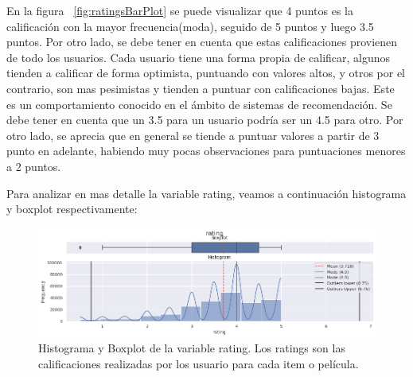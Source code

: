 \documentclass[11pt,a4paper,twoside]{thesis}
\begin{document}
En la figura ~\ref{fig:ratingsBarPlot} se puede visualizar que 4 puntos es la calificación con la mayor frecuencia(moda), seguido de 5 puntos y luego 3.5 puntos. Por otro lado, se debe tener en cuenta que estas calificaciones provienen de todo los usuarios. Cada usuario tiene una forma propia de calificar, algunos tienden a calificar de forma optimista, puntuando con valores altos, y otros por el contrario, son mas pesimistas y tienden a puntuar con calificaciones bajas. Este es un comportamiento conocido en el ámbito de sistemas de recomendación. Se debe tener en cuenta que un 3.5 para un usuario podría ser un 4.5 para otro. Por otro lado, se aprecia que en general se tiende a puntuar valores a partir de 3 punto en adelante, habiendo muy pocas observaciones para puntuaciones menores a 2 puntos.

\clearpage

Para analizar en mas detalle la variable rating, veamos a continuación histograma y boxplot respectivamente:

\begin{center}
\end{center}

\begin{figure}[h!]
	\centering
	\includegraphics[width=15cm]{./images/rating-boxplot-histplot.png}
	\caption{Histograma y Boxplot de la variable rating. Los ratings son las calificaciones realizadas por los usuario para cada item o película.}
	\label{fig:ratingsHistPlot}
\end{figure}
\end{document}

